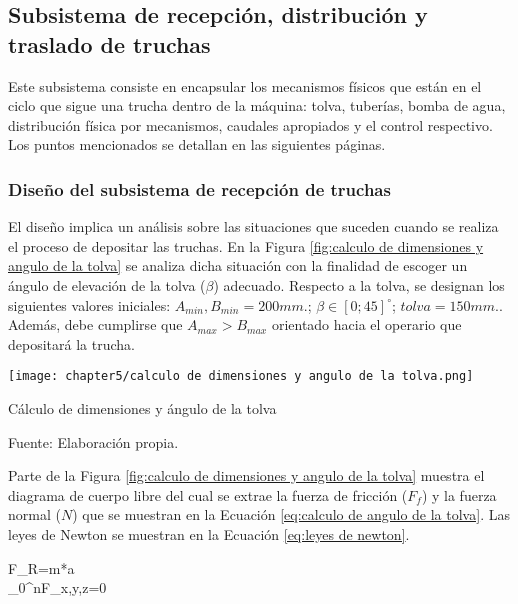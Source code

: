\subsection{Subsistema de recepción, distribución y traslado de truchas}
\label{ssec:subsistema de recepcion, distribucion y traslado de truchas}

Este subsistema consiste en encapsular los mecanismos físicos que están en el ciclo que sigue una trucha dentro de la máquina: tolva, tuberías, bomba de agua, distribución física por mecanismos, caudales apropiados y el control respectivo. Los puntos mencionados se detallan en las siguientes páginas.

\subsubsection{Diseño del subsistema de recepción de truchas}

El diseño implica un análisis sobre las situaciones que suceden cuando se realiza el proceso de depositar las truchas. En la Figura \ref{fig:calculo de dimensiones y angulo de la tolva} se analiza dicha situación con la finalidad de escoger un ángulo de elevación de la tolva ($\beta$) adecuado. Respecto a la tolva, se designan los siguientes valores iniciales: $A_{min},B_{min}=200 mm.$; $\beta \in [0;45] ^\circ$; ${tolva}=150 mm.$. Además, debe cumplirse que $A_{max}>B_{max}$ orientado hacia el operario que depositará la trucha.

\begin{myfigure}[H]
	\centering
	\texttt{[image: chapter5/calculo de dimensiones y angulo de la tolva.png]}
	\caption{Cálculo de dimensiones y ángulo de la tolva}
	\begin{myflushleftportland}
		Fuente: Elaboración propia.
	\end{myflushleftportland}
	\label{fig:calculo de dimensiones y angulo de la tolva}
\end{myfigure}

Parte de la Figura \ref{fig:calculo de dimensiones y angulo de la tolva} muestra el diagrama de cuerpo libre del cual se extrae la fuerza de fricción ($F_{f}$) y la fuerza normal ($N$) que se muestran en la Ecuación \ref{eq:calculo de angulo de la tolva}. Las leyes de Newton se muestran en la Ecuación \ref{eq:leyes de newton}. 

\begin{myequation}\label{eq:leyes de newton}
	\begin{split}
		F_{R}=m*a \\
		\sum_{0}^{n}F_{x,y,z}=0
	\end{split}
\end{myequation}

